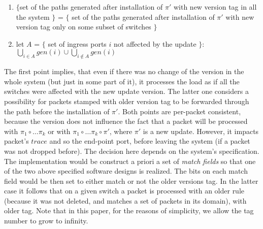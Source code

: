 \documentclass{article}
\theoremstyle{remark}
\begin{document}
\begin{enumerate}
\item $\lbrace$set of the paths generated after installation of $\pi'$ with new version tag in all the system $\rbrace$ = $\lbrace$ set of the paths generated after installation of $\pi'$ with new version tag only on some subset of switches $\rbrace$
\item let $A$ = $\lbrace$ set of ingress ports $i$ not affected by the update $\rbrace$:
$\bigcup\limits_{i\in A} gen(i)\cup\bigcup\limits_{i\notin A}gen(i)$
\end{enumerate}
The first point implies, that even if there was no change of the version in the whole system (but just in some part of it), it processes the load as if all the switches were affected with the new update version. The latter one considers a possibility for packets stamped with older version tag to be forwarded through the path before the installation of $\pi'$.  
Both points are per-packet consistent, because the version does not influence the fact that a packet will be processed with $\pi_1\circ\ldots\pi_k$ or with $\pi_1\circ\ldots\pi_k\circ\pi'$, where $\pi'$ is a new update. However, it impacts packet's $trace$ and so the end-point port, before leaving the system (if a packet was not dropped before). The decision here depends on the system's specification.
The implementation would be construct a priori a set of \emph{match fields} so that one of the two above specified software designs is realized. The bits on each match field would be then set to either match or not the older versions tag. In the latter case it follows that on a given switch a packet is processed with an older rule (because it was not deleted, and matches a set of packets in its domain), with older tag. Note that in this paper, for the reasons of simplicity, we allow the tag number to grow to infinity. 

\end{document}
